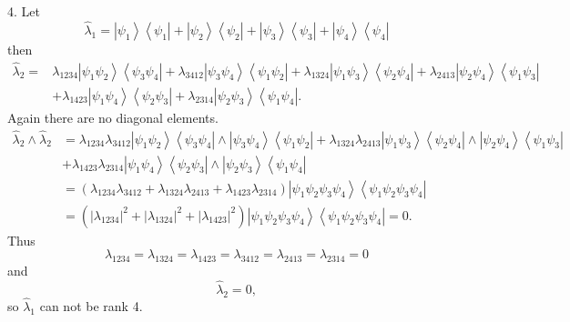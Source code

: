 \documentclass[aps,preprint]{revtex4}%
\begin{document}
4. Let
\begin{equation}
\hat{\lambda}_{1}=\left\vert \psi_{1}\right\rangle \left\langle \psi
_{1}\right\vert +\left\vert \psi_{2}\right\rangle \left\langle \psi
_{2}\right\vert +\left\vert \psi_{3}\right\rangle \left\langle \psi
_{3}\right\vert +\left\vert \psi_{4}\right\rangle \left\langle \psi
_{4}\right\vert
\end{equation}
then
\begin{align}
\hat{\lambda}_{2}=  &  \lambda_{1234}\left\vert \psi_{1}\psi_{2}\right\rangle
\left\langle \psi_{3}\psi_{4}\right\vert +\lambda_{3412}\left\vert \psi
_{3}\psi_{4}\right\rangle \left\langle \psi_{1}\psi_{2}\right\vert
+\lambda_{1324}\left\vert \psi_{1}\psi_{3}\right\rangle \left\langle \psi
_{2}\psi_{4}\right\vert +\lambda_{2413}\left\vert \psi_{2}\psi_{4}%
\right\rangle \left\langle \psi_{1}\psi_{3}\right\vert \nonumber\\
&  +\lambda_{1423}\left\vert \psi_{1}\psi_{4}\right\rangle \left\langle
\psi_{2}\psi_{3}\right\vert +\lambda_{2314}\left\vert \psi_{2}\psi
_{3}\right\rangle \left\langle \psi_{1}\psi_{4}\right\vert .
\end{align}
Again there are no diagonal elements.
\begin{align}
\hat{\lambda}_{2}\wedge\hat{\lambda}_{2}  &  =\lambda_{1234}\lambda
_{3412}\left\vert \psi_{1}\psi_{2}\right\rangle \left\langle \psi_{3}\psi
_{4}\right\vert \wedge\left\vert \psi_{3}\psi_{4}\right\rangle \left\langle
\psi_{1}\psi_{2}\right\vert +\lambda_{1324}\lambda_{2413}\left\vert \psi
_{1}\psi_{3}\right\rangle \left\langle \psi_{2}\psi_{4}\right\vert
\wedge\left\vert \psi_{2}\psi_{4}\right\rangle \left\langle \psi_{1}\psi
_{3}\right\vert \nonumber\\
&  +\lambda_{1423}\lambda_{2314}\left\vert \psi_{1}\psi_{4}\right\rangle
\left\langle \psi_{2}\psi_{3}\right\vert \wedge\left\vert \psi_{2}\psi
_{3}\right\rangle \left\langle \psi_{1}\psi_{4}\right\vert \nonumber\\
&  =\left(  \lambda_{1234}\lambda_{3412}+\lambda_{1324}\lambda_{2413}%
+\lambda_{1423}\lambda_{2314}\right)  \left\vert \psi_{1}\psi_{2}\psi_{3}%
\psi_{4}\right\rangle \left\langle \psi_{1}\psi_{2}\psi_{3}\psi_{4}\right\vert
\nonumber\\
&  =\left(  \left\vert \lambda_{1234}\right\vert ^{2}+\left\vert
\lambda_{1324}\right\vert ^{2}+\left\vert \lambda_{1423}\right\vert
^{2}\right)  \left\vert \psi_{1}\psi_{2}\psi_{3}\psi_{4}\right\rangle
\left\langle \psi_{1}\psi_{2}\psi_{3}\psi_{4}\right\vert =0.
\end{align}
Thus
\begin{equation}
\lambda_{1234}=\lambda_{1324}=\lambda_{1423}=\lambda_{3412}=\lambda
_{2413}=\lambda_{2314}=0
\end{equation}
and
\begin{equation}
\hat{\lambda}_{2}=0,
\end{equation}
so $\hat{\lambda}_{1}$ can not be rank 4.
\end{document}
